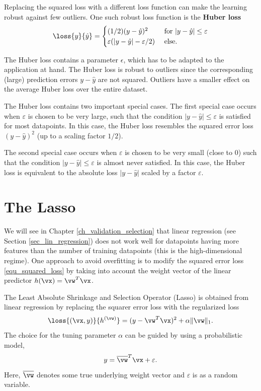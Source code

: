 \documentclass[12pt]{report}
\begin{document}
Replacing the squared loss with a different loss function can 
make the learning robust against few outliers. One such robust 
loss function is the {\bf Huber loss} \cite{HuberRobustBook}
\begin{equation}
\loss{y}{\hat{y}} = \begin{cases} (1/2) (y-\hat{y})^{2} & \mbox{ for } |y-\hat{y}| \leq   \varepsilon \\ 
\varepsilon(|y-\hat{y}| - \varepsilon/2) & \mbox{ else. }\end{cases}
\end{equation}

The Huber loss contains a parameter $\epsilon$, which has to 
be adapted to the application at hand. The Huber loss is robust 
to outliers since the corresponding (large) prediction errors 
$y - \hat{y}$ are not squared. Outliers have a smaller effect 
on the average Huber loss over the entire dataset. 

The Huber loss contains two important special cases. 
The first special case occurs when $\varepsilon$ 
is chosen to be very large, such that the condition 
$|y-\hat{y}| \leq \varepsilon$ is satisfied for most 
datapoints. In this case, the Huber loss resembles 
the squared error loss $(y-\hat{y})^{2}$ (up to a scaling factor $1/2$). 

The second special case occurs when $\varepsilon$ is chosen 
to be very small (close to $0$) such that the condition $|y-\hat{y}| \leq \varepsilon$ 
is almost never satisfied. In this case, the Huber loss is equivalent 
to the absolute loss $|y - \hat{y}|$ scaled by a factor $\varepsilon$.

\section{The Lasso}
\label{sec_lasso}
We will see in Chapter \ref{ch_validation_selection} that linear 
regression (see Section \ref{sec_lin_regression}) does not work 
well for datapoints having more features than the number of 
training datapoints (this is the high-dimensional regime). 
One approach to avoid overfitting is to modify the squared error 
loss \eqref{equ_squared_loss} by taking into account the weight 
vector of the linear predictor $h(\vx) = \vw^{T}\vx$. 

The Least Absolute Shrinkage and Selection Operator (Lasso) is 
obtained from linear regression by replacing the squarer error loss 
with the regularized loss 
\begin{equation}
\loss{(\vx,y)}{h^{(\vw)}} = (y-\vw^{T}\vx)^{2} + \alpha \| \vw \|_{1}. 
\end{equation}
The choice for the tuning parameter $\alpha$ can be guided 
by using a probabilistic model, 
$$ y = \overline{\vw}^{T} \vx + \varepsilon.$$ 
Here, $\overline{\vw}$ denotes some true underlying weight vector 
and $\varepsilon$ is as a random variable. 
\end{document}
